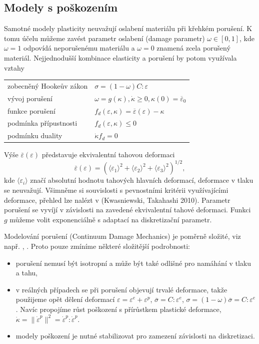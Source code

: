 \documentclass{article}
\begin{document}
\subsection{Modely s poškozením}
Samotné modely plasticity neuvažují oslabení materiálu při křehkém porušení. K tomu účelu můžeme zavést parametr oslabení (damage parametr) $\omega\in[0,1]$, kde $\omega = 1$ odpovídá neporušenému materiálu a $\omega = 0$ znamená zcela porušený materiál. Nejjednodušší kombinace elasticity a porušení by potom využívala vztahy
\begin{table}[h!]
	\centering
	\begin{tabular}{ll}
		\hline
		zobecněný Hookeův zákon & $\sigma = (1-\omega)C : \varepsilon$\\
		vývoj porušení & $\omega = g(\kappa), \dot{\kappa} \geq 0, \kappa(0) = \overline{\varepsilon}_0$\\
		funkce porušení & $f_d(\varepsilon,\kappa)=\overline{\varepsilon}(\varepsilon)-\kappa$\\
		podmínka přípustnosti & $f_d(\varepsilon,\kappa)\leq 0$ \\
		podmínku duality & $\dot{\kappa} f_d =0$\\
		\hline
	\end{tabular}
\end{table}

Výše $\overline{\varepsilon}(\varepsilon)$ představuje ekvivalentní tahovou deformaci
$$
	\overline{\varepsilon}(\varepsilon) = (\langle\varepsilon_1\rangle^2+\langle\varepsilon_2\rangle^2+\langle\varepsilon_3\rangle^2)^{1/2},
$$
kde $\langle\varepsilon_i\rangle$ značí absolutní hodnotu tahových hlavních deformací, deformace v
tlaku se neuvažují. Všimněme si souvislosti s pevnostními kritérii využívajícími deformace, přehled lze nalézt v (Kwasniewski, Takahashi 2010). Parametr porušení se vyvíjí v závislosti na zavedené ekvivalentní tahové deformaci. Funkci $g$ můžeme volit exponenciálně s adaptací na diskretizační parametr.

Modelování porušení (Continuum Damage Mechanics) je poměrně složité, viz např. \cite{Lemaitre1992}, \cite{Neto2011}. Proto pouze zmíníme některé složitější podrobnosti:
\begin{itemize}
	\item porušení nemusí být isotropní a může být také odlišné pro namáhání v tlaku a tahu,
	\item v reálných případech se při porušení objevují trvalé deformace, takže
	použijeme opět dělení deformací $\varepsilon=\varepsilon^e + \varepsilon^p$, $\overline{\sigma} = C : \varepsilon^e$, $\sigma = (1-\omega)\overline{\sigma} = C : \varepsilon^e$. Navíc propojíme růst poškození s přírůstkem plastické deformace, $\dot{\kappa} = \|\dot{\varepsilon}^p\|^2 = \dot{\varepsilon}^p : \dot{\varepsilon}^p$.
	\item modely poškození je nutné stabilizovat pro zamezení závislosti na diskretizaci.
\end{itemize}
\end{document}
